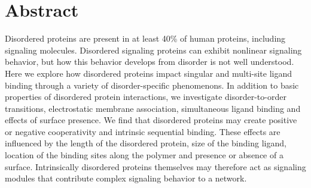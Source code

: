 \documentclass[../AdvancementSummary.tex]{subfiles}
\begin{document}
\section{Abstract}

Disordered proteins are present in at least 40\% of human proteins, including signaling molecules. Disordered signaling proteins can exhibit nonlinear signaling behavior, but how this behavior develops from disorder is not well understood. Here we explore how disordered proteins impact singular and multi-site ligand binding through a variety of disorder-specific phenomenons. In addition to basic properties of disordered protein interactions, we investigate disorder-to-order transitions, electrostatic membrane association, simultaneous ligand binding and effects of surface presence. We find that disordered proteins may create positive or negative cooperativity and intrinsic sequential binding. These effects are influenced by the length of the disordered protein, size of the binding ligand, location of the binding sites along the polymer and presence or absence of a surface. Intrinsically disordered proteins themselves may therefore act as signaling modules that contribute complex signaling behavior to a network.
\end{document}
